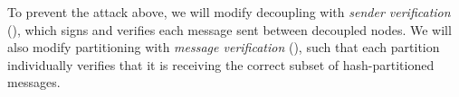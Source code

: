 

To prevent the attack above, we will modify decoupling with \emph{sender verification} (), which signs and verifies each message sent between decoupled nodes.
We will also modify partitioning with \emph{message verification} (), such that each partition individually verifies that it is receiving the correct subset of hash-partitioned messages.

